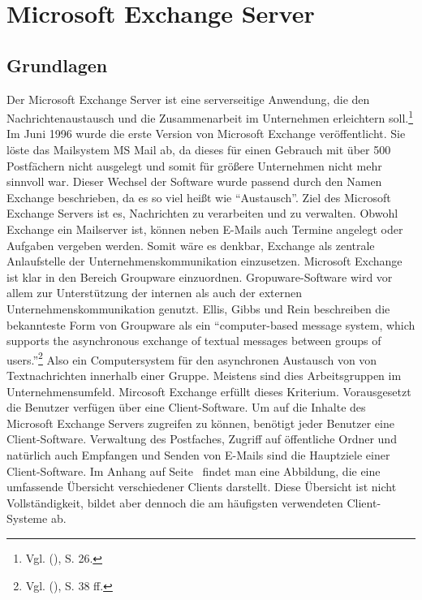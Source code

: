 \section{Microsoft Exchange Server}

\subsection{Grundlagen}
\noindent 
Der  Microsoft Exchange Server ist eine serverseitige Anwendung, die den Nachrichtenaustausch und die Zusammenarbeit im Unternehmen erleichtern soll.\footnote{Vgl. \citeauthor{Joos} (\citeyear{Joos}), S. 26.} Im Juni 1996 wurde die erste Version von Microsoft Exchange veröffentlicht. Sie löste das Mailsystem MS Mail ab, da dieses für einen Gebrauch mit über 500 Postfächern nicht ausgelegt und somit für größere Unternehmen nicht mehr sinnvoll war. Dieser Wechsel der Software wurde passend durch den Namen Exchange beschrieben, da es so viel heißt wie \enquote{Austausch}. Ziel des Microsoft Exchange Servers ist es, Nachrichten zu verarbeiten und zu verwalten. Obwohl Exchange ein Mailserver ist, können neben E-Mails auch Termine angelegt oder Aufgaben vergeben werden. Somit wäre es denkbar, Exchange als zentrale Anlaufstelle der Unternehmenskommunikation einzusetzen.\newline
Microsoft Exchange ist klar in den Bereich Groupware einzuordnen. Gropuware-Software wird vor allem zur Unterstützung der internen als auch der externen Unternehmenskommunikation genutzt. Ellis, Gibbs und Rein beschreiben die bekannteste Form von Groupware als ein 
\enquote{computer-based message system, which supports the asynchronous exchange of textual messages between groups of users.}\footnote{Vgl. \citeauthor{Ellis} (\citeyear{Ellis}), S. 38 ff.} Also ein Computersystem für den asynchronen Austausch von von Textnachrichten innerhalb einer Gruppe. Meistens sind dies Arbeitsgruppen im Unternehmensumfeld. Mircosoft Exchange erfüllt dieses Kriterium. Vorausgesetzt die Benutzer verfügen über eine Client-Software.\newline
Um auf die Inhalte des Microsoft Exchange Servers zugreifen zu können, benötigt jeder Benutzer eine Client-Software. Verwaltung des Postfaches, Zugriff auf öffentliche Ordner und natürlich auch Empfangen und Senden von E-Mails sind die Hauptziele einer Client-Software. Im Anhang auf Seite~\pageref{Exchange Verbindung} findet man eine Abbildung, die eine umfassende Übersicht verschiedener Clients darstellt. Diese Übersicht ist nicht Vollständigkeit, bildet aber dennoch die am häufigsten verwendeten Client-Systeme ab.\newline
